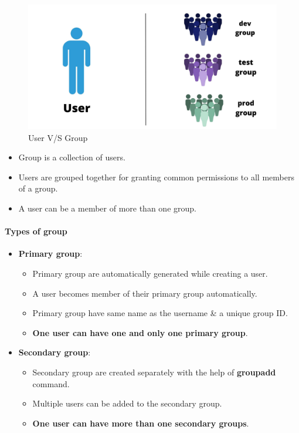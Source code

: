\setlength{\columnsep}{3pt}
\begin{flushleft}
	\bigskip
	\begin{figure}[h!]
	\centering
	\includegraphics[scale=.2]{content/chapter4/images/user_group.jpg}
	\caption{User V/S Group}
	\label{fig:user_group}
	\end{figure}
	\bigskip

	\begin{itemize}
		\item Group is a collection of users.
		\item Users are grouped together for granting common permissions to all members of a group.
		\item A user can be a member of more than one group.
	\end{itemize}

\newpage
	\paragraph{Types of group}
	
	\begin{itemize}
		\item \textbf{Primary group}:
		\begin{itemize}
			\item Primary group are automatically generated while creating a user.
			\item A user becomes member of their primary group automatically.
			\item Primary group have same name as the username \& a unique group ID.
			\item \textbf{One user can have one and only one primary group}.
		\end{itemize} 
		\item \textbf{Secondary group}:
		\begin{itemize}
			\item Secondary group are created separately with the help of \textbf{groupadd} command.
			\item Multiple users can be added to the secondary group.
			\item \textbf{One user can have more than one secondary groups}.
		\end{itemize} 
	\end{itemize}
	

\end{flushleft}
